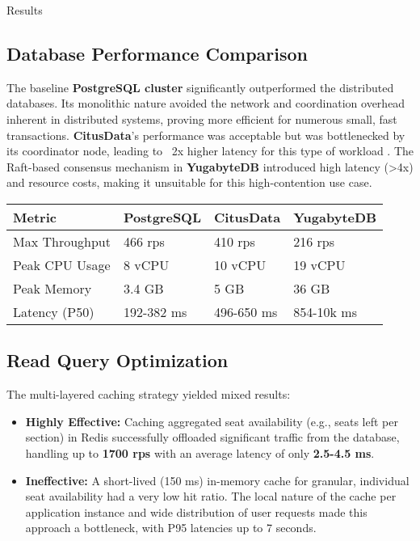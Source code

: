 \documentclass[a0,landscape]{config/poster/a0poster}
\newcommand{\postersection}[1]{%
  \begin{tcolorbox}[
      colback=IEEEblue,
      colframe=IEEEblue,
      fonttitle=\bfseries,
      coltext=white,
      sharp corners,
      boxrule=0pt,
      top=4pt,
      bottom=4pt,
      halign=center
    ]
    \large #1
  \end{tcolorbox}%
}
\begin{document}
\begin{multicols}{4}

	\postersection{Results}
	\subsection*{Database Performance Comparison}
	The baseline \textbf{PostgreSQL cluster} significantly outperformed the distributed databases. Its monolithic nature avoided the network and coordination overhead inherent in distributed systems, proving more efficient for numerous small, fast transactions. \textbf{CitusData}'s performance was acceptable but was bottlenecked by its coordinator node, leading to ~2x higher latency for this type of workload \cite{Slot2020}. The Raft-based consensus mechanism in \textbf{YugabyteDB} introduced high latency (\textgreater4x) and resource costs, making it unsuitable for this high-contention use case.

	\begin{center}\vspace{0.5cm}
		\begin{tabular}{l l l l}
			\toprule
			\textbf{Metric} & \textbf{PostgreSQL} & \textbf{CitusData} & \textbf{YugabyteDB} \\
			\midrule
			Max Throughput  & 466 rps             & 410 rps            & 216 rps             \\
			Peak CPU Usage  & 8 vCPU              & 10 vCPU            & 19 vCPU             \\
			Peak Memory     & 3.4 GB              & 5 GB               & 36 GB               \\
			Latency (P50)   & 192-382 ms          & 496-650 ms         & 854-10k ms          \\
			\bottomrule
		\end{tabular}
	\end{center}\vspace{0.5cm}

	\subsection*{Read Query Optimization}
	The multi-layered caching strategy yielded mixed results:
	\begin{itemize}
		\item \textbf{Highly Effective:} Caching aggregated seat availability (e.g., seats left per section) in Redis successfully offloaded significant traffic from the database, handling up to \textbf{1700 rps} with an average latency of only \textbf{2.5-4.5 ms}.
		\item \textbf{Ineffective:} A short-lived (150 ms) in-memory cache for granular, individual seat availability had a very low hit ratio. The local nature of the cache per application instance and wide distribution of user requests made this approach a bottleneck, with P95 latencies up to 7 seconds.
	\end{itemize}


\end{multicols}
\end{document}
